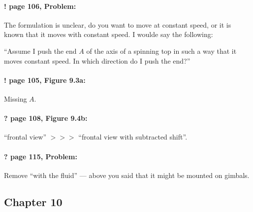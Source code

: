 \documentclass[twoside]{article}
\begin{document}
\paragraph{! page 106, Problem:} The formulation is unclear, do you want to move at constant speed, or it is known that it moves with constant speed. I woulde say the following:

``Assume I push the end $A$ of the axis of a spinning top in such a way that it moves  constant speed. In which direction do I push the end?''

\paragraph{! page 105, Figure 9.3a:} Missing $A$.

\paragraph{? page 108, Figure 9.4b:} ``frontal view'' $>\!>\!>$ ``frontal view with subtracted shift''.

\paragraph{? page 115, Problem:} Remove ``with the fluid'' --- above you said that it might be mounted on gimbals.

\subsection*{Chapter 10}
\end{document}
